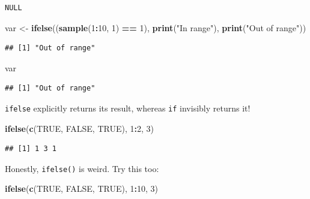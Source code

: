 \documentclass[]{book}
\newenvironment{Shaded}{\begin{snugshade}}{\end{snugshade}}
\newcommand{\DecValTok}[1]{\textcolor[rgb]{0.00,0.00,0.81}{#1}}
\newcommand{\KeywordTok}[1]{\textcolor[rgb]{0.13,0.29,0.53}{\textbf{#1}}}
\newcommand{\NormalTok}[1]{#1}
\newcommand{\OperatorTok}[1]{\textcolor[rgb]{0.81,0.36,0.00}{\textbf{#1}}}
\newcommand{\OtherTok}[1]{\textcolor[rgb]{0.56,0.35,0.01}{#1}}
\newcommand{\StringTok}[1]{\textcolor[rgb]{0.31,0.60,0.02}{#1}}
\begin{document}
\begin{verbatim}
NULL
\end{verbatim}

\begin{Shaded}
\begin{Highlighting}[]
\NormalTok{var <-}\StringTok{ }\KeywordTok{ifelse}\NormalTok{((}\KeywordTok{sample}\NormalTok{(}\DecValTok{1}\OperatorTok{:}\DecValTok{10}\NormalTok{, }\DecValTok{1}\NormalTok{) }\OperatorTok{==}\StringTok{ }\DecValTok{1}\NormalTok{), }\KeywordTok{print}\NormalTok{(}\StringTok{"In range"}\NormalTok{), }\KeywordTok{print}\NormalTok{(}\StringTok{"Out of range"}\NormalTok{))}
\end{Highlighting}
\end{Shaded}

\begin{verbatim}
## [1] "Out of range"
\end{verbatim}

\begin{Shaded}
\begin{Highlighting}[]
\NormalTok{var}
\end{Highlighting}
\end{Shaded}

\begin{verbatim}
## [1] "Out of range"
\end{verbatim}

\texttt{ifelse} explicitly returns its result, whereas \texttt{if} invisibly returns it!

\begin{Shaded}
\begin{Highlighting}[]
\KeywordTok{ifelse}\NormalTok{(}\KeywordTok{c}\NormalTok{(}\OtherTok{TRUE}\NormalTok{, }\OtherTok{FALSE}\NormalTok{, }\OtherTok{TRUE}\NormalTok{), }\DecValTok{1}\OperatorTok{:}\DecValTok{2}\NormalTok{, }\DecValTok{3}\NormalTok{)}
\end{Highlighting}
\end{Shaded}

\begin{verbatim}
## [1] 1 3 1
\end{verbatim}

Honestly, \texttt{ifelse()} is weird. Try this too:

\begin{Shaded}
\begin{Highlighting}[]
\KeywordTok{ifelse}\NormalTok{(}\KeywordTok{c}\NormalTok{(}\OtherTok{TRUE}\NormalTok{, }\OtherTok{FALSE}\NormalTok{, }\OtherTok{TRUE}\NormalTok{), }\DecValTok{1}\OperatorTok{:}\DecValTok{10}\NormalTok{, }\DecValTok{3}\NormalTok{)}
\end{Highlighting}
\end{Shaded}
\end{document}
